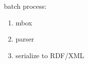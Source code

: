 \documentclass[spanish,notes=hide]{beamer}
\begin{document}
{\begin{columns}
\begin{column}{0.5\textwidth}
\begin{center}
	\end{center}
   \end{column}
   \begin{column}{0.5\textwidth}
	\begin{Large}batch process:\end{Large}
	\begin{enumerate}
	 \item<2-> mbox
	 \item<3-> parser
	 \item<4-> serialize to RDF/XML 
	\end{enumerate}
   \end{column}
  \end{columns}
}
\end{document}
